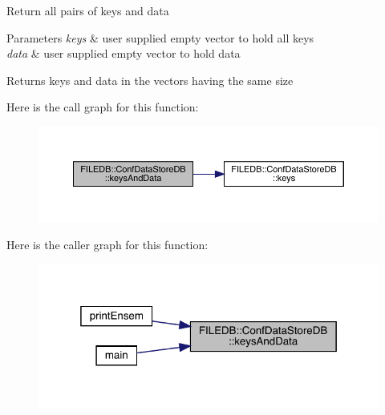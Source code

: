 Return all pairs of keys and data 
\begin{DoxyParams}{Parameters}
{\em keys} & user supplied empty vector to hold all keys \\
\hline
{\em data} & user supplied empty vector to hold data \\
\hline
\end{DoxyParams}
\begin{DoxyReturn}{Returns}
keys and data in the vectors having the same size 
\end{DoxyReturn}
Here is the call graph for this function\+:
\nopagebreak
\begin{figure}[H]
\begin{center}
\leavevmode
\includegraphics[width=350pt]{d8/d19/classFILEDB_1_1ConfDataStoreDB_a94333e6aab463fd336bffb28d81dd39d_cgraph}
\end{center}
\end{figure}
Here is the caller graph for this function\+:
\nopagebreak
\begin{figure}[H]
\begin{center}
\leavevmode
\includegraphics[width=319pt]{d8/d19/classFILEDB_1_1ConfDataStoreDB_a94333e6aab463fd336bffb28d81dd39d_icgraph}
\end{center}
\end{figure}
\mbox{\label{classFILEDB_1_1ConfDataStoreDB_a94333e6aab463fd336bffb28d81dd39d}} 
